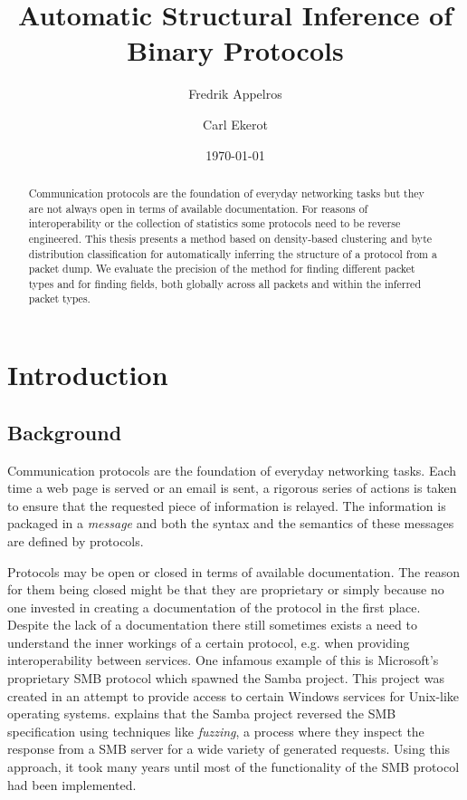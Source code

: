 \documentclass[a4paper]{report}
\begin{document}
\title{Automatic Structural Inference of Binary Protocols}
\author{Fredrik Appelros \and Carl Ekerot}
\date{\today}
\maketitle

\begin{abstract}
Communication protocols are the foundation of everyday networking tasks but
they are not always open in terms of available documentation. For reasons of
interoperability or the collection of statistics some protocols need to be
reverse engineered. This thesis presents a method based on density-based
clustering and byte distribution classification for automatically inferring the
structure of a protocol from a packet dump. We evaluate the precision of the
method for finding different packet types and for finding fields, both globally
across all packets and within the inferred packet types.
\end{abstract}

\tableofcontents

\chapter{Introduction}

\section{Background}
Communication protocols are the foundation of everyday networking tasks. Each
time a web page is served or an email is sent, a rigorous series of actions is
taken to ensure that the requested piece of information is relayed. The
information is packaged in a \emph{message} and both the syntax and the
semantics of these messages are defined by protocols.

Protocols may be open or closed in terms of available documentation. The reason
for them being closed might be that they are proprietary or simply because no
one invested in creating a documentation of the protocol in the first place.
Despite the lack of a documentation there still sometimes exists a need to
understand the inner workings of a certain protocol, e.g. when providing
interoperability between services. One infamous example of this is Microsoft's
proprietary SMB protocol which spawned the Samba project. This project was
created in an attempt to provide access to certain Windows services for
Unix-like operating systems. \citet{tridgell03} explains that the Samba project
reversed the SMB specification using techniques like \emph{fuzzing}, a process
where they inspect the response from a SMB server for a wide variety of
generated requests. Using this approach, it took many years until most of the
functionality of the SMB protocol had been implemented.
\end{document}
